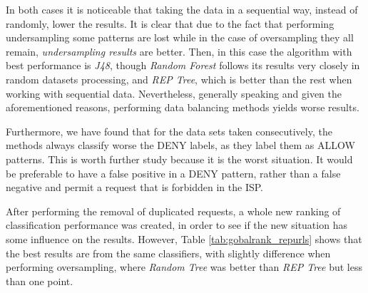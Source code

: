 \documentclass{llncs}
\begin{document}
In both cases it is noticeable that taking the data in a sequential way, instead of randomly, lower the results. It is clear that due to the fact that performing undersampling some patterns are lost while in the case of oversampling they all remain, \textit{undersampling results} are better. Then, in this case the algorithm with best performance is \textit{J48}, though \textit{Random Forest} follows its results very closely in random datasets processing, and \textit{REP Tree}, which is better than the rest when working with sequential data. Nevertheless, generally speaking and given the aforementioned reasons, performing data balancing methods yields worse results.

Furthermore, we have found that for the data sets taken consecutively, the methods always classify worse the DENY labels, as they label them as ALLOW patterns. This is worth further study because it is the worst situation. It would be preferable to have a false positive in a DENY pattern, rather than a false negative and permit a request that is forbidden in the ISP.


After performing the removal of duplicated requests, a whole new ranking of classification performance was created, in order to see if the new situation has some influence on the results. However, Table  \ref{tab:gobalrank_repurls} shows that the best results are from the same classifiers, with slightly difference when performing oversampling, where \textit{Random Tree} was better than \textit{REP Tree} but less than one point.
\end{document}

